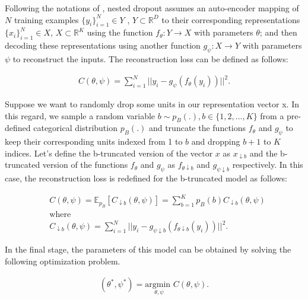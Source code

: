 Following the notations of \citep{nested_drop}, nested dropout assumes an auto-encoder mapping of $N$ training examples $\{y_i\}_{i=1}^N \in Y $ , $ Y \subset \mathbb{R}^D$ to their corresponding representations $\{x_i\}_{i=1}^N \in X$, $X \subset \mathbb{R}^K$ using the function $f_\theta:Y\rightarrow X$ with parameters $\theta$; and then decoding these representations using another function $g_\psi: X\rightarrow Y$ with parameters $\psi$ to reconstruct the inputs. The reconstruction loss can be defined as follows:

\begin{equation}
\begin{split}
        C(\theta, \psi)= \sum_{i=1}^N ||y_i - g_\psi(f_\theta (y_i)) ||^2. 
\end{split}
\end{equation}

Suppose we want to randomly drop some units in our representation vector x. In this regard, we sample a random variable $b\sim p_B(.), b\in \{1, 2, ..., K\}$ from a pre-defined categorical distribution $p_B(.)$ and truncate the functions $f_\theta$ and $g_\psi$ to keep their corresponding units indexed from 1 to $b$ and dropping $b+1$ to $K$ indices. Let's define the b-truncated version of the vector $x$ as $x_{\downarrow b}$ and the b-truncated version of the functions $f_\theta$ and $g_\psi$ as $f_{\theta \downarrow b}$ and $g_{\psi \downarrow b}$ respectively. In this case, the reconstruction loss is redefined for the b-truncated model as follows:

\begin{equation}
\begin{split}
        &C(\theta, \psi)= \mathbb{E}_{p_B}[C_{\downarrow b}(\theta, \psi)] =  \sum_{b=1}^K p_B(b) C_{\downarrow b}(\theta, \psi)\\
        &\text{where} \\
        &  C_{\downarrow b}(\theta, \psi)= \sum_{i=1}^N ||y_i - g_{\psi \downarrow b} (f_{\theta\downarrow b} (y_i)) ||^2.
\end{split}
\end{equation}

In the final stage, the parameters of this model can be obtained by solving the following optimization problem.

\begin{equation}
\begin{split}
        (\theta^*, \psi^*) =  \underset{\theta, \psi}{\text{argmin }} C(\theta, \psi).  
\end{split}
\end{equation}

